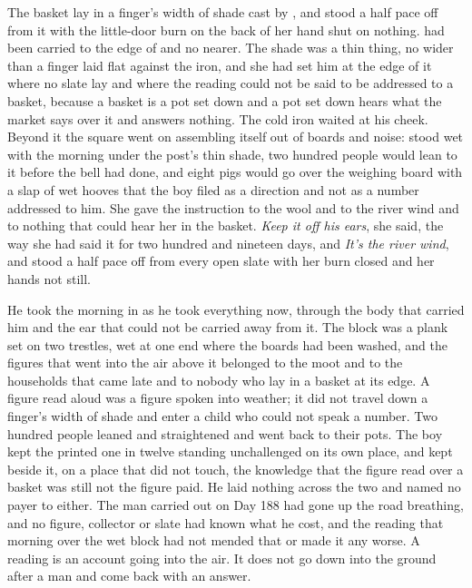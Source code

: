 The basket lay in a finger's width of shade cast by , and  stood a half pace off from it with the little-door burn on the back of her hand shut on nothing.  had been carried to the edge of  and no nearer. The shade was a thin thing, no wider than a finger laid flat against the iron, and she had set him at the edge of it where no slate lay and where the reading could not be said to be addressed to a basket, because a basket is a pot set down and a pot set down hears what the market says over it and answers nothing. The cold iron waited at his cheek. Beyond it the square went on assembling itself out of boards and noise:  stood wet with the morning under the post's thin shade, two hundred people would lean to it before the bell had done, and eight pigs would go over the weighing board with a slap of wet hooves that the boy filed as a direction and not as a number addressed to him. She gave the instruction to the wool and to the river wind and to nothing that could hear her in the basket. \emph{Keep it off his ears}, she said, the way she had said it for two hundred and nineteen days, and \emph{It's the river wind}, and stood a half pace off from every open slate with her burn closed and her hands not still.

He took the morning in as he took everything now, through the body that carried him and the ear that could not be carried away from it. The block was a plank set on two trestles, wet at one end where the boards had been washed, and the figures that went into the air above it belonged to the moot and to the households that came late and to nobody who lay in a basket at its edge. A figure read aloud was a figure spoken into weather; it did not travel down a finger's width of shade and enter a child who could not speak a number. Two hundred people leaned and straightened and went back to their pots. The boy kept the printed one in twelve standing unchallenged on its own place, and kept beside it, on a place that did not touch, the knowledge that the figure read over a basket was still not the figure paid. He laid nothing across the two and named no payer to either. The man carried out on Day 188 had gone up the road breathing, and no figure, collector or slate had known what he cost, and the reading that morning over the wet block had not mended that or made it any worse. A reading is an account going into the air. It does not go down into the ground after a man and come back with an answer.

